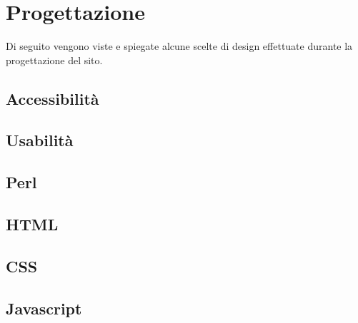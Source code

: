 \section{Progettazione}

Di seguito vengono viste e spiegate alcune scelte di design effettuate durante la progettazione del sito.

\subsection{Accessibilità}

\subsection{Usabilità}

\subsection{Perl}

\subsection{HTML}

\subsection{CSS}

\subsection{Javascript}
